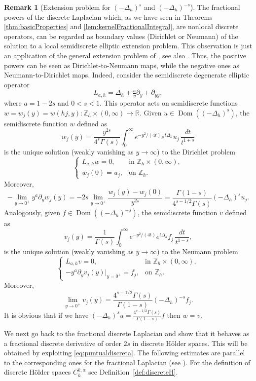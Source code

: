 \documentclass[a4paper,11pt,reqno]{amsart}
\newcommand{\R}{\mathbb{R}}
\newcommand{\Z}{\mathbb{Z}}
\newcommand{\Dom}{\operatorname{Dom}}
\theoremstyle{definition}
\newtheorem{rem}[thm]{Remark}
\numberwithin{equation}{section}
\begin{document}
\begin{rem}[Extension problem for $(-\Delta_h)^s$ and $(-\Delta_h)^{-s}$]
\label{rem:extension problem}
The fractional powers of the discrete Laplacian
which, as we have seen in Theorems \ref{thm:basicProperties} and \ref{lem:kernelFractionalIntegral},
are nonlocal discrete operators, can be regarded as
boundary values (Dirichlet or Neumann) of the solution to
a local semidiscrete elliptic extension problem. This observation is just an application of the
general extension problem of \cite{Stinga, Stinga-Torrea}, see also \cite{Gale}.
Thus, the positive powers can be seen as Dirichlet-to-Neumann maps,
while the negative ones as Neumann-to-Dirichlet maps.
Indeed, consider the semidiscrete degenerate elliptic operator
$$
L_{a,h}= \Delta_h+\tfrac{a}{y}\partial_y+\partial_{yy},
$$
where $a=1-2s$ and $0<s<1$.
This operator acts on semidiscrete functions $w=w_j(y)=w(hj,y):\Z_h\times(0,\infty)\to\R$.
Given $u\in\Dom((-\Delta_h)^s)$, the semidiscrete function $w$ defined as
$$
w_j(y)= \frac{y^{2s}}{4^s \Gamma(s)} \int_0^\infty e^{-y^2/(4t)}e^{t\Delta_h}u_j\,\frac{dt}{t^{1+s}}
$$
is the unique solution (weakly vanishing as $y\to\infty$) to the Dirichlet problem
$$
\begin{cases}
L_{a,h}w=0,&\text{in } \Z_h\times(0,\infty),\\
w_j(0)=u_j,&\text{on } \Z_h.
\end{cases}
$$
Moreover,
$$
-\lim_{y\rightarrow 0^+}y^a\partial_yw_j(y)=
-2s\lim_{y\to0^+}\frac{w_j(y)-w_j(0)}{y^{2s}}=
\frac{\Gamma(1-s)}{4^{s-1/2}\Gamma(s)}(-\Delta_h)^su_j.
$$
Analogously, given $f\in\Dom((-\Delta_h)^{-s})$, the semidiscrete function $v$ defined as
$$
v_j(y)= \frac{1}{\Gamma(s)}\int_0^\infty e^{-y^2/(4t)}e^{t\Delta_h}f_j\,\frac{dt}{t^{1-s}},
$$
is the unique solution (weakly vanishing as $y\to\infty$) to the Neumann problem
$$
\begin{cases}
L_{a,h}v=0, &\text{in } \Z_h\times(0,\infty),\\
-y^a\partial_yv_j(y)\big|_{y=0^+}=f_j,&\text{on } \Z_h.
\end{cases}
$$
Moreover,
$$
\lim_{y\rightarrow 0^+}v_j(y)=\frac{4^{s-1/2}\Gamma(s)}{\Gamma(1-s)}(-\Delta_h)^{-s}f_j.
$$
It is obvious that if we have $(-\Delta_h)^su=\frac{4^{s-1/2}\Gamma(s)}{\Gamma(1-s)}f$ then $w=v$.
\end{rem}

We next go back to the fractional discrete Laplacian and show that it behaves
as a fractional discrete derivative of order $2s$ in discrete H\"older spaces.
This will be obtained by exploiting \eqref{eq:puntualdiscreta}. The following estimates
are parallel to the corresponding ones for the fractional Laplacian
(see \cite{Silvestre-CPAM}). For the definition of discrete H\"older spaces $C^{k,\alpha}_h$
see Definition~\ref{def:discreteH}.
\end{document}
